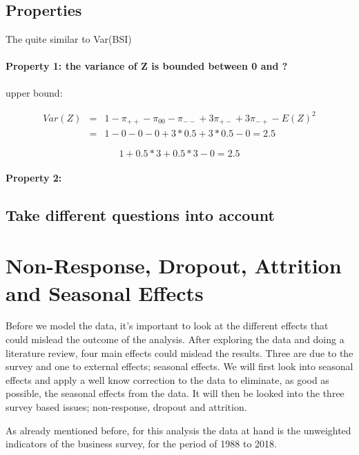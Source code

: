 \documentclass[12pt,a4paper,oneside]{book}
\begin{document}
\section{Properties}

The 
quite similar to Var(BSI)


\subsubsection{Property 1: the variance of Z is bounded between 0 and ?}
upper bound:

\begin{eqnarray}
Var(Z) &=& 1 - \pi_{++} - \pi_{00} - \pi_{--} + 3\pi_{+-} + 3\pi_{-+} - E(Z)^2 \nonumber \\
	&=& 1 - 0 - 0 - 0 + 3*0.5 + 3*0.5 - 0 = 2.5 \nonumber
\end{eqnarray}


\begin{equation}
	1+ 0.5*3 + 0.5*3 - 0 = 2.5
\end{equation}

\subsubsection{Property 2: }

\section{Take different questions into account}




\chapter{Non-Response, Dropout, Attrition and Seasonal Effects}
\label{chap:nonresponse dropout}

Before we model the data, it's important to look at the different effects that could mislead the outcome of the analysis. After exploring the data and doing a literature review, four main effects could mislead the results. Three are due to the survey and one to external effects; seasonal effects. We will first look into seasonal effects and apply a well know correction to the data to eliminate, as good as possible, the seasonal effects from the data.
It will then be looked into the three survey based issues; non-response, dropout and attrition.

As already mentioned before, for this analysis the data at hand is the unweighted indicators of the business survey, for the period of 1988 to 2018.
\end{document}
